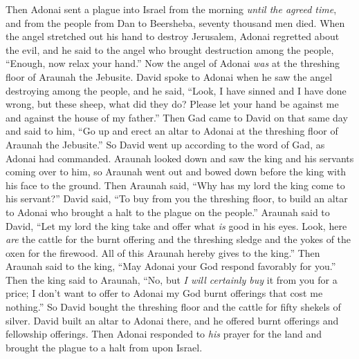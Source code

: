\begin{biblechapter}
\verse Then Adonai sent a plague into Israel from the morning \textit{until the agreed time}, and from the people from Dan to Beersheba, seventy thousand men died.
\verse When the angel stretched out his hand to destroy Jerusalem, Adonai regretted about the evil, and he said to the angel who brought destruction among the people, “Enough, now relax your hand.” Now the angel of Adonai \textit{was} at the threshing floor of Araunah the Jebusite.
\verse David spoke to Adonai when he saw the angel destroying among the people, and he said, “Look, I have sinned and I have done wrong, but these sheep, what did they do? Please let your hand be against me and against the house of my father.”
\verse Then Gad came to David on that same day and said to him, “Go up and erect an altar to Adonai at the threshing floor of Araunah the Jebusite.”
\verse So David went up according to the word of Gad, as Adonai had commanded.
\verse Araunah looked down and saw the king and his servants coming over to him, so Araunah went out and bowed down before the king with his face to the ground.
\verse Then Araunah said, “Why has my lord the king come to his servant?” David said, “To buy from you the threshing floor, to build an altar to Adonai who brought a halt to the plague on the people.”
\verse Araunah said to David, “Let my lord the king take and offer what \textit{is} good in his eyes. Look, here \textit{are} the cattle for the burnt offering and the threshing sledge and the yokes of the oxen for the firewood.
\verse All of this Araunah hereby gives to the king.” Then Araunah said to the king, “May Adonai your God respond favorably for you.”
\verse Then the king said to Araunah, “No, but \textit{I will certainly buy} it from you for a price; I don’t want to offer to Adonai my God burnt offerings that cost me nothing.” So David bought the threshing floor and the cattle for fifty shekels of silver.
\verse David built an altar to Adonai there, and he offered burnt offerings and fellowship offerings. Then Adonai responded to \textit{his} prayer for the land and brought the plague to a halt from upon Israel.
\end{biblechapter}

